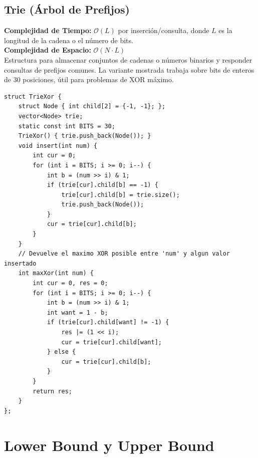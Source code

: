 \documentclass[10pt,twocolumn,letterpaper]{report}
\begin{document}
\section{Trie (Árbol de Prefijos)}
\textbf{Complejidad de Tiempo:} $\mathcal{O}(L)$ por inserción/consulta, donde $L$ es la longitud de la cadena o el número de bits. \\
\textbf{Complejidad de Espacio:} $\mathcal{O}(N \cdot L)$ \\
Estructura para almacenar conjuntos de cadenas o números binarios y responder consultas de prefijos comunes. La variante mostrada trabaja sobre bits de enteros de 30 posiciones, útil para problemas de XOR máximo.
\begin{lstlisting}
struct TrieXor {
    struct Node { int child[2] = {-1, -1}; };
    vector<Node> trie;
    static const int BITS = 30;
    TrieXor() { trie.push_back(Node()); }
    void insert(int num) {
        int cur = 0;
        for (int i = BITS; i >= 0; i--) {
            int b = (num >> i) & 1;
            if (trie[cur].child[b] == -1) {
                trie[cur].child[b] = trie.size();
                trie.push_back(Node());
            }
            cur = trie[cur].child[b];
        }
    }
    // Devuelve el maximo XOR posible entre 'num' y algun valor insertado
    int maxXor(int num) {
        int cur = 0, res = 0;
        for (int i = BITS; i >= 0; i--) {
            int b = (num >> i) & 1;
            int want = 1 - b;
            if (trie[cur].child[want] != -1) {
                res |= (1 << i);
                cur = trie[cur].child[want];
            } else {
                cur = trie[cur].child[b];
            }
        }
        return res;
    }
};
\end{lstlisting}
\chapter{Lower Bound y Upper Bound}
\end{document}
